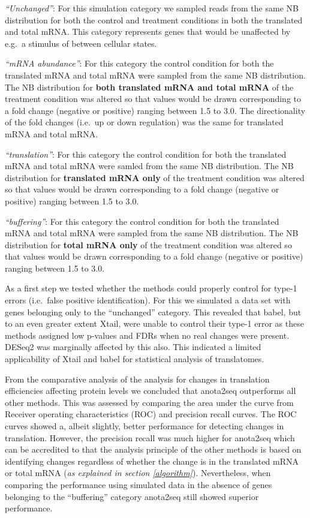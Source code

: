 \documentclass[12pt,openany]{book}
\begin{document}
\emph{``Unchanged''}: For this simulation category we sampled reads from
the same NB distribution for both the control and treatment conditions
in both the translated and total mRNA. This category represents genes
that would be unaffected by e.g.~a stimulus of between cellular states.

\emph{``mRNA abundance''}: For this category the control condition for
both the translated mRNA and total mRNA were sampled from the same NB
distribution. The NB distribution for \textbf{both translated mRNA and
total mRNA} of the treatment condition was altered so that values would
be drawn corresponding to a fold change (negative or positive) ranging
between 1.5 to 3.0. The directionality of the fold changes (i.e.~up or
down regulation) was the same for translated mRNA and total mRNA.

\emph{``translation''}: For this category the control condition for both
the translated mRNA and total mRNA were samled from the same NB
distribution. The NB distribution for \textbf{translated mRNA only} of
the treatment condition was altered so that values would be drawn
corresponding to a fold change (negative or positive) ranging between
1.5 to 3.0.

\emph{``buffering''}: For this category the control condition for both
the translated mRNA and total mRNA were sampled from the same NB
distribution. The NB distribution for \textbf{total mRNA only} of the
treatment condition was altered so that values would be drawn
corresponding to a fold change (negative or positive) ranging between
1.5 to 3.0.

As a first step we tested whether the methods could properly control for
type-1 errors (i.e.~false positive identification). For this we
simulated a data set with genes belonging only to the ``unchanged''
category. This revealed that babel, but to an even greater extent Xtail,
were unable to control their type-1 error as these methods assigned low
p-values and FDRs when no real changes were present. DESeq2 was
marginally affected by this also. This indicated a limited applicability
of Xtail and babel for statistical analysis of translatomes.

From the comparative analysis of the analysis for changes in translation
efficiencies affecting protein levels we concluded that anota2seq
outperforms all other methods. This was assessed by comparing the area
under the curve from Receiver operating characteristics (ROC) and
precision recall curves. The ROC curves showed a, albeit slightly,
better performance for detecting changes in translation. However, the
precision recall was much higher for anota2seq which can be accredited
to that the analysis principle of the other methods is based on
identifying changes regardless of whether the change is in the
translated mRNA or total mRNA (\emph{as explained in section
\ref{algorithm}}). Nevertheless, when comparing the performance using
simulated data in the absence of genes belonging to the ``buffering''
category anota2seq still showed superior performance.
\end{document}
